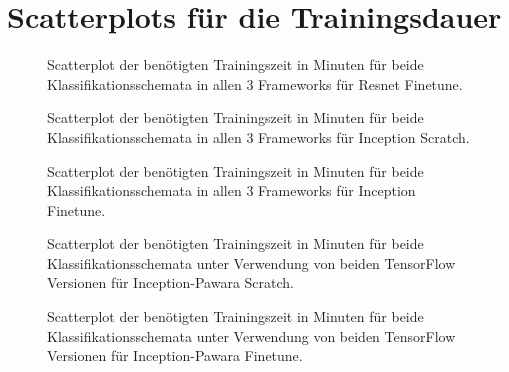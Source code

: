 \section{Scatterplots für die Trainingsdauer}
\label{ch:Anhang_ScatterplotsDauer}

\begin{figure}[H]
\begin{adjustbox}{width=\textwidth, center}

\end{adjustbox}
\caption{Scatterplot der benötigten Trainingszeit in Minuten für beide Klassifikationsschemata in allen 3 Frameworks für Resnet Finetune.}
\label{fig:ScatterplotRF-dauer}
\end{figure}
\begin{figure}[H]
\begin{adjustbox}{width=\textwidth, center}

\end{adjustbox}
\caption{Scatterplot der benötigten Trainingszeit in Minuten für beide Klassifikationsschemata in allen 3 Frameworks für Inception Scratch.}
\label{fig:ScatterplotIS-dauer}
\end{figure}
\begin{figure}[H]
\begin{adjustbox}{width=\textwidth, center}

\end{adjustbox}
\caption{Scatterplot der benötigten Trainingszeit in Minuten für beide Klassifikationsschemata in allen 3 Frameworks für Inception Finetune.}
\label{fig:ScatterplotIF-dauer}
\end{figure}
\begin{figure}[H]
\begin{adjustbox}{width=\textwidth, center}

\end{adjustbox}
\caption{Scatterplot der benötigten Trainingszeit in Minuten für beide Klassifikationsschemata unter Verwendung von beiden TensorFlow \cite{tensorflow} Versionen für Inception-Pawara Scratch.}
\label{fig:ScatterplotIPS-dauer}
\end{figure}
\begin{figure}[H]
\begin{adjustbox}{width=\textwidth, center}

\end{adjustbox}
\caption{Scatterplot der benötigten Trainingszeit in Minuten für beide Klassifikationsschemata unter Verwendung von beiden TensorFlow \cite{tensorflow} Versionen für Inception-Pawara Finetune.}
\label{fig:ScatterplotIPF-dauer}
\end{figure}